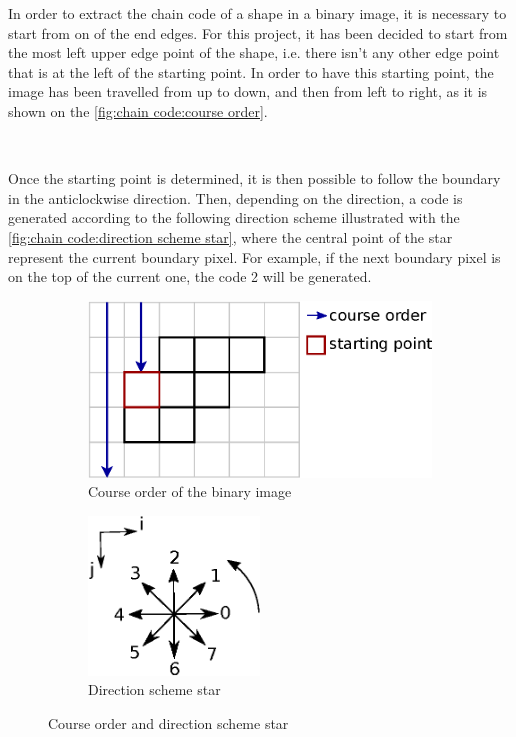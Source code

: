 In order to extract the chain code of a shape in a binary image, it is necessary to start from on of the end edges. For this project, it has been decided to start from the most left upper edge point of the shape, i.e. there isn't any other edge point that is at the left of the starting point. In order to have this starting point, the image has been travelled from up to down, and then from left to right, as it is shown on the \vref{fig:chain code:course order}.


~~


Once the starting point is determined, it is then possible to follow the boundary in the anticlockwise direction. Then, depending on the direction, a code is generated according to the following direction scheme illustrated with the \vref{fig:chain code:direction scheme star}, where the central point of the star represent the current boundary pixel. For example, if the next boundary pixel is on the top of the current one, the code 2 will be generated. 


\begin{figure}[H]
	\centering
	
  	\begin{subfigure}[b]{0.5\textwidth}
    	\includegraphics[width=\textwidth]{images/chain_code/course_order}
		\caption{Course order of the binary image \cite{bib:chain:ParametreGeometriqueChaineFreeman}}
		\label{fig:chain code:course order}	
  	\end{subfigure}
  	\begin{subfigure}[b]{0.4\textwidth}
  		\centering
    	\includegraphics[width=0.5\textwidth]{images/chain_code/direction_scheme_star}
    	\caption{Direction scheme star \cite{bib:chain:ParametreGeometriqueChaineFreeman}}
		\label{fig:chain code:direction scheme star}
  	\end{subfigure}
	
	\caption{Course order and direction scheme star}
\end{figure}




